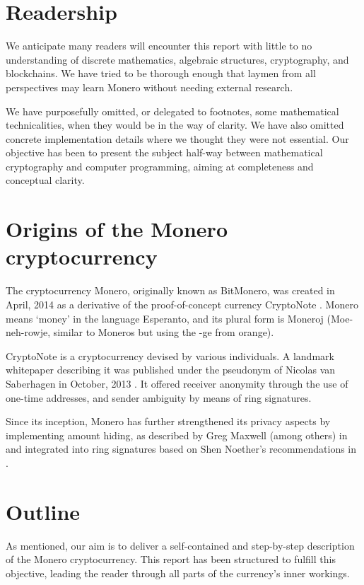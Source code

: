 \section{Readership}

We anticipate many readers will encounter this report with little to no understanding of discrete mathematics, algebraic structures, cryptography, and blockchains. We have tried to be thorough enough that laymen from all perspectives may learn Monero without needing external research.

We have purposefully omitted, or delegated to footnotes, some mathematical technicalities, when they would be in the way of clarity. We have also omitted concrete implementation details where we thought they were not essential. Our objective has been to present the subject half-way between mathematical cryptography and computer programming, aiming at completeness and conceptual clarity.



\section{Origins of the Monero cryptocurrency}

The cryptocurrency Monero, originally known as BitMonero, was created in April, 2014 as a derivative of the proof-of-concept currency CryptoNote \cite{bitmonero-launched}. Monero means `money' in the language Esperanto, and its plural form is Moneroj (Moe-neh-rowje, similar to Moneros but using the -ge from orange).

CryptoNote is a cryptocurrency devised by various individuals. A landmark whitepaper describing it was published under the pseudonym of Nicolas van Saberhagen in October, 2013 \cite{cryptoNoteWhitePaper}. It offered receiver anonymity through the use of one-time addresses, and sender ambiguity by means of ring signatures.

Since its inception, Monero has further strengthened its privacy aspects by implementing amount hiding, as described by Greg Maxwell (among others) in \cite{Signatures2015BorromeanRS} and integrated into ring signatures based on Shen Noether's recommendations in \cite{MRL-0005}.
  

\section{Outline}

As mentioned, our aim is to deliver a self-contained and step-by-step description of the Monero cryptocurrency. This report has been structured to fulfill this objective, leading the reader through all parts of the currency’s inner workings.
\\

